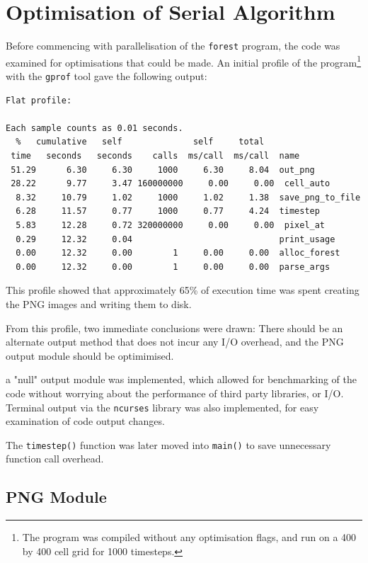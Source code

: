 \documentclass[11pt,a4paper]{report}
\begin{document}
\newpage

\section{Optimisation of Serial Algorithm}

Before commencing with parallelisation of the \texttt{forest} program, the code
was examined for optimisations that could be made. An initial profile of the
program\footnote{The program was compiled without any optimisation flags, and
run on a 400 by 400 cell grid for 1000 timesteps.} with the \texttt{gprof} tool gave the following output:

\begin{verbatim}
Flat profile:

Each sample counts as 0.01 seconds.
  %   cumulative   self              self     total
 time   seconds   seconds    calls  ms/call  ms/call  name
 51.29      6.30     6.30     1000     6.30     8.04  out_png
 28.22      9.77     3.47 160000000     0.00     0.00  cell_auto
  8.32     10.79     1.02     1000     1.02     1.38  save_png_to_file
  6.28     11.57     0.77     1000     0.77     4.24  timestep
  5.83     12.28     0.72 320000000     0.00     0.00  pixel_at
  0.29     12.32     0.04                             print_usage
  0.00     12.32     0.00        1     0.00     0.00  alloc_forest
  0.00     12.32     0.00        1     0.00     0.00  parse_args

\end{verbatim}

This profile showed that approximately 65\% of execution time was spent
creating the PNG images and writing them to disk.

From this profile, two immediate conclusions were drawn: There should be an
alternate output method that does not incur any I/O overhead, and the PNG
output module should be optimimised.

a "null" output module was implemented, which allowed for benchmarking of the
code without worrying about the performance of third party libraries, or I/O.
Terminal output via the \texttt{ncurses} library was also implemented, for easy
examination of code output changes.

The \texttt{timestep()} function was later moved into \texttt{main()} to save
unnecessary function call overhead.

\subsection{PNG Module}
\end{document}
